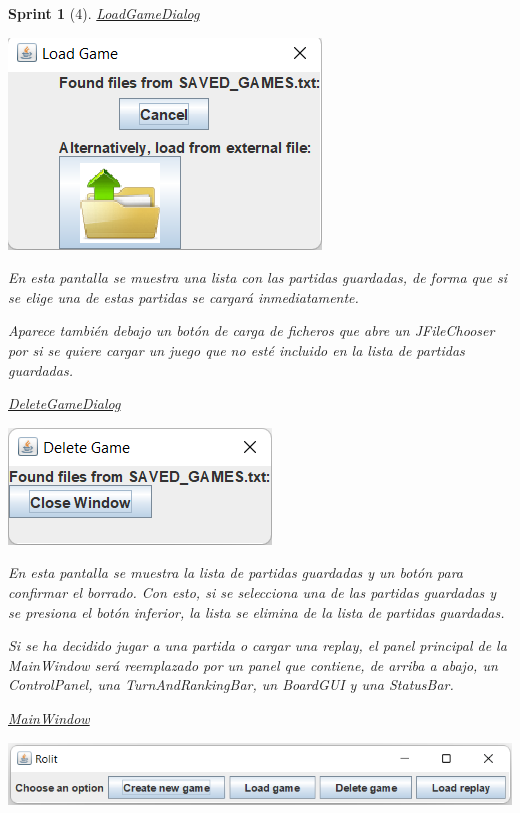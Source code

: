 \documentclass{article}
\theoremstyle{break}
\newtheorem*{sprint}{Sprint}
\begin{document}
\begin{sprint}[4]
\underline{LoadGameDialog}
\begin{center}
\includegraphics[scale=0.8]{load-dialog-sprint3.png}
\end{center}

En esta pantalla se muestra una lista con las partidas guardadas, de forma que si se elige una de estas partidas se cargará inmediatamente.

Aparece también debajo un botón de carga de ficheros que abre un  \textit{JFileChooser} por si se quiere cargar un juego que no esté incluido en la lista de partidas guardadas.

\underline{DeleteGameDialog}
\begin{center}
\includegraphics[scale=0.8]{delete-dialog-sprint3.png}
\end{center}

En esta pantalla se muestra la lista de partidas guardadas y un botón para confirmar el borrado. Con esto, si se selecciona una de las partidas guardadas y se presiona el botón inferior, la lista se elimina de la lista de partidas guardadas.

Si se ha decidido jugar a una partida o cargar una replay, el panel principal de la \textit{MainWindow} será reemplazado por un panel que contiene, de arriba a abajo, un ControlPanel, una TurnAndRankingBar, un BoardGUI y una StatusBar.

\underline{MainWindow}
\begin{center}
\includegraphics[scale=0.8]{menu-sprint3.png}
\end{center}


\end{sprint}
\end{document}
